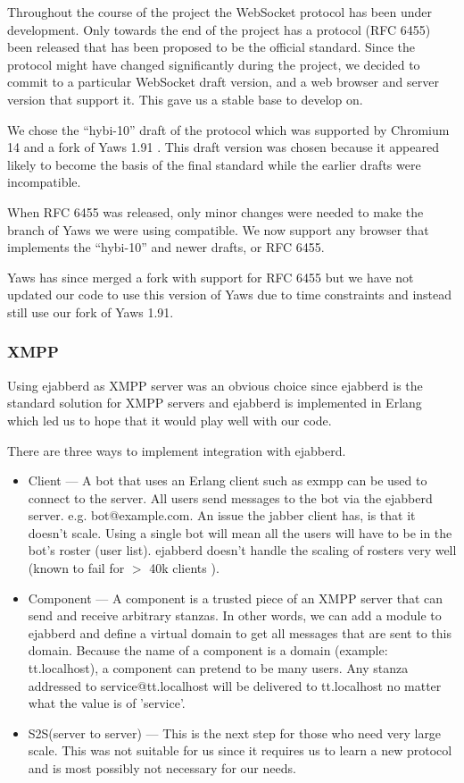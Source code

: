 \documentclass[11pt,a4paper]{report}
\begin{document}
Throughout the course of the project the WebSocket protocol has
been under development. Only towards the end of the project has a protocol
(RFC 6455) been released that has been proposed to be the official standard.
Since the protocol might have changed significantly during the project, we
decided to commit to a particular WebSocket draft version, and a web browser and
server version that support it. This gave us a stable base to develop on.

We chose the ``hybi-10'' draft of the protocol \cite{hybi-10} which was
supported by Chromium 14 and a fork of Yaws 1.91 \cite{yaws-fork}. This draft
version was chosen because it appeared likely to become the basis of the final
standard \cite{new-websocket-google-blog} while the earlier drafts were
incompatible.

When RFC 6455 was released, only minor changes were needed to make the branch of
Yaws we were using compatible. We now support any browser that implements
the ``hybi-10'' and newer drafts, or RFC 6455.

Yaws has since merged a fork with support for RFC 6455 but we have not updated
our code to use this version of Yaws due to time constraints and instead still
use our fork of Yaws 1.91\cite{our-yaws}.


\subsubsection{XMPP}
Using ejabberd\cite{ejabberd} as XMPP server was an obvious choice since ejabberd is the
standard solution for XMPP servers and ejabberd is implemented
in Erlang which led us to hope that it would play well with our code.

There are three ways to implement integration with ejabberd.

\begin{itemize}
\item Client --- A bot that uses an Erlang client such as exmpp\cite{exmpp} can be used to
connect to the server.
All users send messages to the bot via the ejabberd server. e.g. bot@example.com.
An issue the jabber client has, is that it doesn’t scale. Using a single bot
will mean all the users will have to be in the bot’s roster (user list).
ejabberd doesn’t handle the scaling of rosters very well (known to fail for
$>$ 40k clients \cite{40k-roster}).
\item Component --- A component is a trusted piece of an XMPP server that can send
and receive arbitrary stanzas.
In other words, we can add a module to ejabberd and define a virtual domain to
get all messages that are sent to this domain.
Because the name of a component is a domain (example: tt.localhost), a component
can pretend to be many users.
Any stanza addressed to service@tt.localhost will be delivered to tt.localhost
no matter what the value is of 'service'.
\item S2S(server to server) --- This is the next step for those who need very
large scale. This was not suitable for us since it requires us to learn a new
protocol and is most possibly not necessary for our needs.
\end{itemize}
\end{document}
